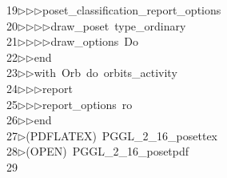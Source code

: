 \begin{tabbing}
19\>$\triangleright$\>$\triangleright$\>$\triangleright$\>poset\_classification\_report\_options\ \\[0pt]
20\>$\triangleright$\>$\triangleright$\>$\triangleright$\>$\triangleright$\>draw\_poset\ type\_ordinary\ \\[0pt]
21\>$\triangleright$\>$\triangleright$\>$\triangleright$\>$\triangleright$\>draw\_options\ Do\ \\[0pt]
22\>$\triangleright$\>$\triangleright$\>end\ \\[0pt]
23\>$\triangleright$\>$\triangleright$\>with\ Orb\ do\ orbits\_activity\ \\[0pt]
24\>$\triangleright$\>$\triangleright$\>$\triangleright$\>report\ \ \\[0pt]
25\>$\triangleright$\>$\triangleright$\>$\triangleright$\>report\_options\ ro\ \\[0pt]
26\>$\triangleright$\>$\triangleright$\>end\ \\[0pt]
27\>$\triangleright$\>(PDFLATEX)\ PGGL\_2\_16\_posettex\\[0pt]
28\>$\triangleright$\>(OPEN)\ PGGL\_2\_16\_posetpdf\\[0pt]
29\>\end{tabbing}
